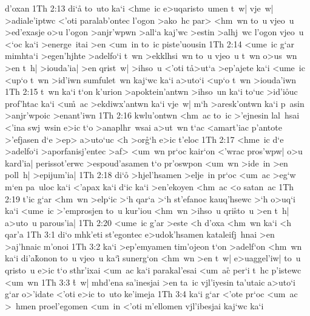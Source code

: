 d'oxan\bibvsend
\vs 1Th 2:13
di`a\r{}
to~uto
ka`i
<hme~ic
e>uqaristo~umen
t~w|
vje~w|
>adiale'iptwc
<'oti
paralab'ontec
l'ogon
>ako~hc
par>
<hm~wn
to~u
vjeo~u
>ed'exasje
o>u
l'ogon
>anjr'wpwn
>all`a
kaj'wc
>estin
>alhj~wc
l'ogon
vjeo~u
<`oc
ka`i
>energe~itai
>en
<um~in
to~ic
piste'uousin\bibvsend
\vs 1Th 2:14
<ume~ic
g`ar
mimhta`i
>egen'hjhte
>adelfo`i
t~wn
>ekklhsi~wn
to~u
vjeo~u
t~wn
o>us~wn
>en
t~h|
>iouda'ia|
>en
qrist~w|
>ihso~u
<'oti
t\r{a}>ut`a
>ep'ajete
ka`i
<ume~ic
<up`o
t~wn
>id'iwn
sumfulet~wn
kaj`wc
ka`i
a>uto`i
<up`o
t~wn
>iouda'iwn\bibvsend
\vs 1Th 2:15
t~wn
ka`i
t`on
k'urion
>apoktein'antwn
>ihso~un
ka`i
to`uc
>id'i\r{o}uc
prof'htac
ka`i
<u\r{m}~ac
>ekdiwx'antwn
ka`i
vje~w|
m`h
>aresk'ontwn
ka`i
p~asin
>anjr'wpoic
>enant'iwn\bibvsend
\vs 1Th 2:16
kwlu'ontwn
<hm~ac
to~ic
>'ejnesin
lal~hsai
<'ina
swj~wsin
e>ic
t`o
>anaplhr~wsai
a>ut~wn
t`ac
<amart'iac
p'antote
>'efjasen
d`e
>ep>
a>uto`uc
<h
>or\r{g}`h
e>ic
t'eloc\bibvsend
\vs 1Th 2:17
<hme~ic
d`e
>adelfo`i
>aporfanisj'entec
>af>
<um~wn
pr`oc
kair`on
<'wrac
pros'wpw|
o>u
kard'ia|
perissot'erwc
>espoud'asamen
t`o
pr'oswpon
<um~wn
>ide~in
>en
poll~h|
>epijum'ia|\bibvsend
\vs 1Th 2:18
di`o\r{}
>hjel'hsamen
>elje~in
pr`oc
<um~ac
>eg`w
m`en
pa~uloc
ka`i
<'apax
ka`i
d`ic
ka`i
>en'ekoyen
<hm~ac
<o
satan~ac\bibvsend
\vs 1Th 2:19
t'ic
g`ar
<hm~wn
>elp`ic
>`h
qar`a
>`h
st'efanoc
kauq'hsewc
>`h
o>uq`i
ka`i
<ume~ic
>'emprosjen
to~u
kur'iou
<hm~wn
>ihso~u
qri\r{s}to~u
>en
t~h|
a>uto~u
parous'ia|\bibvsend
\vs 1Th 2:20
<ume~ic
g'ar
>este
<h
d'oxa
<hm~wn
ka`i
<h
qar'a\bibvsend
\vs 1Th 3:1
di`o
mhk'eti
st'egontec
e>udok'hsamen
kataleifj~hnai
>en
>aj'hnaic
m'onoi\bibvsend
\vs 1Th 3:2
ka`i
>ep'emyamen
tim'ojeon
t`on
>adelf`on
<hm~wn
ka`i
di'a\r{k}onon
to~u
vjeo~u
ka`i\r{}
sunerg`on
<hm~wn
>en
t~w|
e>uaggel'iw|
to~u
qristo~u
e>ic
t`o
sthr'ixai
<um~ac
ka`i
parakal'esai
<um~ac\r{}
per`i
t~hc
p'istewc
<um~wn\bibvsend
\vs 1Th 3:3
\r{t}~w|
mhd'ena
sa'inesjai
>en
ta~ic
vjl'iyesin
ta'utaic
a>uto`i
g`ar
o>'idate
<'oti
e>ic
to~uto
ke'imeja\bibvsend
\vs 1Th 3:4
ka`i
g`ar
<'ote
pr`oc
<um~ac
>~hmen
proel'egomen
<um~in
<'oti
m'ellomen
vjl'ibesjai
kaj`wc
ka`i

